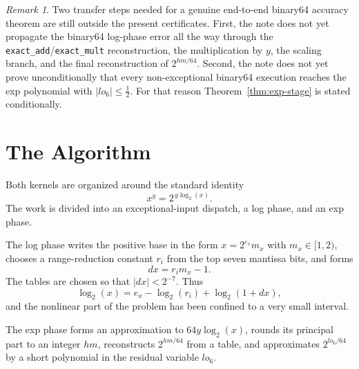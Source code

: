 \documentclass[11pt]{article}
\theoremstyle{plain}
\theoremstyle{remark}
\newtheorem{remark}{Remark}
\begin{document}
\begin{remark}
Two transfer steps needed for a genuine end-to-end binary64 accuracy theorem
are still outside the present certificates.  First, the note does not yet
propagate the binary64 log-phase error all the way through the
\texttt{exact\_add}/\texttt{exact\_mult} reconstruction, the multiplication by
$y$, the scaling branch, and the final reconstruction of $2^{hm/64}$.  Second,
the note does not yet prove unconditionally that every non-exceptional binary64
execution reaches the exp polynomial with $|lo_6| \le \tfrac12$.  For that
reason Theorem~\ref{thm:exp-stage} is stated conditionally.
\end{remark}

\section{The Algorithm}

Both kernels are organized around the standard identity
\[
  x^y = 2^{\,y\log_2(x)}.
\]
The work is divided into an exceptional-input dispatch, a log phase, and an
exp phase.

The log phase writes the positive base in the form $x = 2^{e_x}m_x$ with
$m_x \in [1,2)$, chooses a range-reduction constant $r_i$ from the top seven
mantissa bits, and forms
\[
  dx = r_i m_x - 1.
\]
The tables are chosen so that $|dx| < 2^{-7}$.  Thus
\[
  \log_2(x) = e_x - \log_2(r_i) + \log_2(1+dx),
\]
and the nonlinear part of the problem has been confined to a very small
interval.

The exp phase forms an approximation to $64y\log_2(x)$, rounds its principal
part to an integer $hm$, reconstructs $2^{hm/64}$ from a table, and
approximates $2^{lo_6/64}$ by a short polynomial in the residual variable
$lo_6$.
\end{document}
